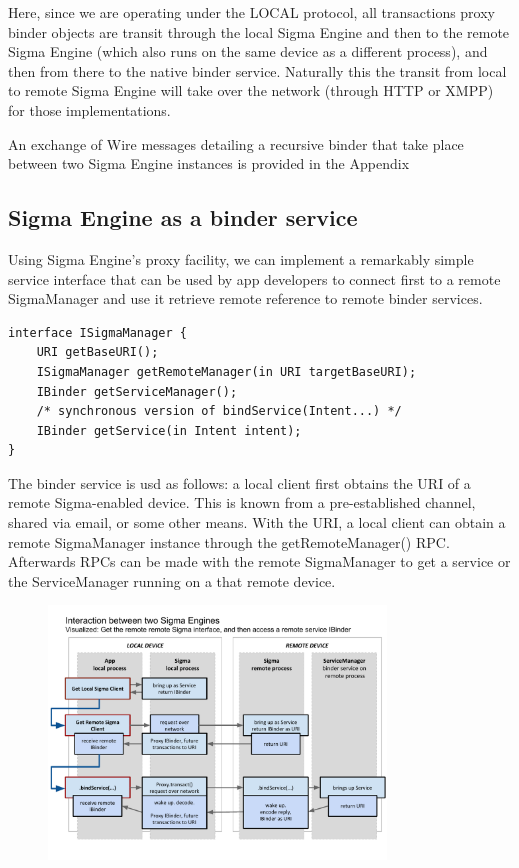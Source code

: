 \documentclass[prodmode]{acmlarge}
\begin{document}
Here, since we are operating under the LOCAL protocol, all transactions proxy binder objects are transit through the local Sigma Engine and then to the remote Sigma Engine (which also runs on the same device as a different process), and then from there to the native binder service. Naturally this the transit from local to remote Sigma Engine will take over the network (through HTTP or XMPP) for those implementations.

An exchange of Wire messages detailing a recursive binder that take place between two Sigma Engine instances is provided in the Appendix

\subsection{Sigma Engine as a binder service}
Using Sigma Engine's proxy facility, we can implement a remarkably simple service interface that can be used by app developers to connect first to a remote SigmaManager and use it retrieve remote reference to remote binder services.
\begin{Verbatim}[samepage=true]
interface ISigmaManager {
    URI getBaseURI();
    ISigmaManager getRemoteManager(in URI targetBaseURI);
    IBinder getServiceManager();
    /* synchronous version of bindService(Intent...) */
    IBinder getService(in Intent intent);
}
\end{Verbatim}
The binder service is usd as follows: a local client first obtains the URI of a remote Sigma-enabled device. This is known from a pre-established channel, shared via email, or some other means. With the URI, a local client can obtain a remote SigmaManager instance through the getRemoteManager() RPC. Afterwards RPCs can be made with the remote SigmaManager to get a service or the ServiceManager running on a that remote device.

\begin{figure}[h][t!]
\centering
\includegraphics[width=0.8\textwidth]{drawings/SigmaEngineInteraction.pdf}
\end{figure}
\end{document}
